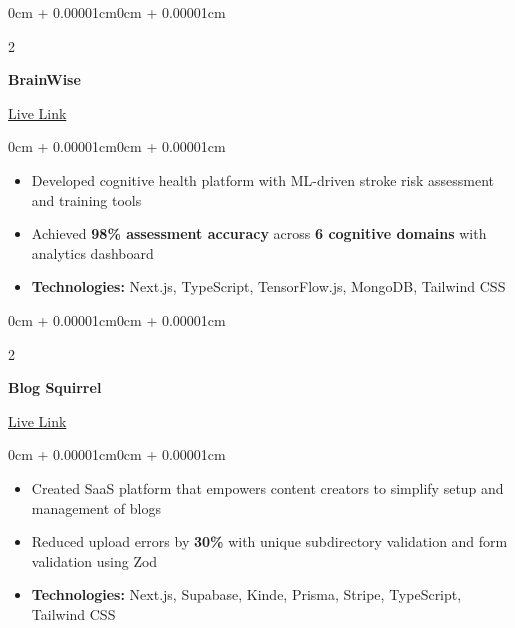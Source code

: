 \documentclass[10pt, letterpaper]{article}
\newenvironment{highlights}{
    \begin{itemize}[
        topsep=0.04cm,
        parsep=0.04cm,
        partopsep=0pt,
        itemsep=0.01cm,
        leftmargin=0.2cm + 9pt
    ]
}{
    \end{itemize}
}
\newenvironment{onecolentry}{
    \begin{adjustwidth}{0cm + 0.00001cm}{0cm + 0.00001cm}
}{
    \end{adjustwidth}
}
\newenvironment{twocolentry}[2][]{
    \onecolentry
    \def\secondColumn{#2}
    \setcolumnwidth{\fill, 4.2cm}
    \begin{paracol}{2}
}{
    \switchcolumn \raggedleft \secondColumn
    \end{paracol}
    \endonecolentry
}
\begin{document}
        \vspace{0.08cm}
        \begin{twocolentry}{
            \textcolor{primaryColor}{\href{https://brainwise-health.vercel.app}{Live Link}}
        }
            \textbf{BrainWise}
        \end{twocolentry}
        \vspace{0.02cm}
        \begin{onecolentry}
            \begin{highlights}
                \item Developed cognitive health platform with ML-driven stroke risk assessment and training tools
                \item Achieved \textbf{98\% assessment accuracy} across \textbf{6 cognitive domains} with analytics dashboard
                \item \textbf{Technologies:} Next.js, TypeScript, TensorFlow.js, MongoDB, Tailwind CSS
            \end{highlights}
        \end{onecolentry}

        \vspace{0.08cm}
        \begin{twocolentry}{
            \textcolor{primaryColor}{\href{https://blog-squirrel.vercel.app}{Live Link}}
        }
            \textbf{Blog Squirrel}
        \end{twocolentry}
        \vspace{0.02cm}
        \begin{onecolentry}
            \begin{highlights}
                \item Created SaaS platform that empowers content creators to simplify setup and management of blogs
                \item Reduced upload errors by \textbf{30\%} with unique subdirectory validation and form validation using Zod
                \item \textbf{Technologies:} Next.js, Supabase, Kinde, Prisma, Stripe, TypeScript, Tailwind CSS
            \end{highlights}
        \end{onecolentry}
        
\end{document}
